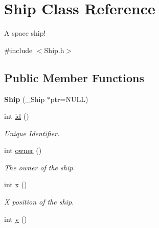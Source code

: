 \hypertarget{classShip}{\section{\-Ship \-Class \-Reference}
\label{classShip}
}


\-A space ship!  




{\ttfamily \#include $<$\-Ship.\-h$>$}

\subsection*{\-Public \-Member \-Functions}
\begin{DoxyCompactItemize}
\item 
\hypertarget{classShip_a6dff9c3d55db16d329ffd72b7710cacb}{{\bfseries \-Ship} (\-\_\-\-Ship $\ast$ptr=\-N\-U\-L\-L)}\label{classShip_a6dff9c3d55db16d329ffd72b7710cacb}

\item 
\hypertarget{classShip_a8c95d9146ac2c51be8a0aaa7e632c9b9}{int \hyperlink{classShip_a8c95d9146ac2c51be8a0aaa7e632c9b9}{id} ()}\label{classShip_a8c95d9146ac2c51be8a0aaa7e632c9b9}

\begin{DoxyCompactList}\small\item\em \-Unique \-Identifier. \end{DoxyCompactList}\item 
\hypertarget{classShip_a89e76688f3be8cb062c3d499df80fd1f}{int \hyperlink{classShip_a89e76688f3be8cb062c3d499df80fd1f}{owner} ()}\label{classShip_a89e76688f3be8cb062c3d499df80fd1f}

\begin{DoxyCompactList}\small\item\em \-The owner of the ship. \end{DoxyCompactList}\item 
\hypertarget{classShip_a77ddb81c9f217deb27ffb27a5681da18}{int \hyperlink{classShip_a77ddb81c9f217deb27ffb27a5681da18}{x} ()}\label{classShip_a77ddb81c9f217deb27ffb27a5681da18}

\begin{DoxyCompactList}\small\item\em \-X position of the ship. \end{DoxyCompactList}\item 
\hypertarget{classShip_a1c40c66fb72bb07916e16f156605fcfe}{int \hyperlink{classShip_a1c40c66fb72bb07916e16f156605fcfe}{y} ()}\label{classShip_a1c40c66fb72bb07916e16f156605fcfe}


\end{DoxyCompactItemize}
